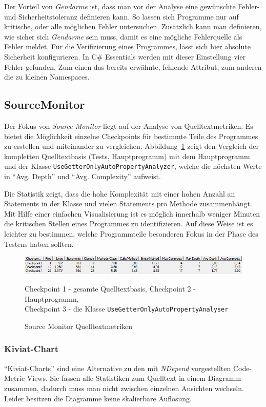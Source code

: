 Der Vorteil von \emph{Gendarme} ist, dass man vor der Analyse eine gewünschte Fehler- und Sicherheitstoleranz definieren kann. So lassen sich Programme nur auf kritische, oder alle möglichen Fehler untersuchen. Zusätzlich kann man definieren, wie sicher sich \emph{Gendarme} sein muss, damit es eine mögliche Fehlerquelle als Fehler meldet. Für die Verifizierung eines Programmes, lässt sich hier absolute Sicherheit konfigurieren. In C\# Essentials werden mit dieser Einstellung vier Fehler gefunden. Zum einen das bereits erwähnte, fehlende Attribut, zum anderen die zu kleinen Namespaces.

\subsection{SourceMonitor}
Der Fokus von \emph{Source Monitor} liegt auf der Analyse von Quelltextmetriken. Es bietet die Möglichkeit einzelne Checkpoints für bestimmte Teile des Programmes zu erstellen und miteinander zu vergleichen. Abbildung~\ref{fig:source-monitor-avg-complexity} zeigt den Vergleich der kompletten Quelltextbasis (Tests, Hauptprogramm) mit dem Hauptprogramm und der Klasse \texttt{UseGetterOnlyAutoPropertyAnalyzer}, welche die höchsten Werte in \enquote{Avg. Depth} und \enquote{Avg. Complexity} aufweist.

Die Statistik zeigt, dass die hohe Komplexität mit einer hohen Anzahl an Statements in der Klasse und vielen Statements pro Methode zusammenhängt. Mit Hilfe einer einfachen Visualisierung ist es möglich innerhalb weniger Minuten die kritischen Stellen eines Programmes zu identifizieren. Auf diese Weise ist es leichter zu bestimmen, welche Programmteile besonderen Fokus in der Phase des Testens haben sollten.

\begin{figure}[!ht]
	\centering
	\includegraphics[width=\textwidth]{images/source-monitor-avg-complexity.png}
	\caption{Source Monitor Quelltextmetriken}
	\vspace{0.1cm}
	Checkpoint 1 - gesamte Quelltextbasis, Checkpoint 2 - Hauptprogramm,\\ Checkpoint 3 - die Klasse \texttt{UseGetterOnlyAutoPropertyAnalyser}
	\label{fig:source-monitor-avg-complexity}
\end{figure}

\subsubsection{Kiviat-Chart}
\enquote{Kiviat-Charts} sind eine Alternative zu den mit \emph{NDepend} vorgestellten Code-Metric-Views. Sie fassen alle Statistiken zum Quelltext in einem Diagramm zusammen, dadurch muss man nicht zwischen einzelnen Ansichten wechseln. Leider besitzen die Diagramme keine skalierbare Auflösung.

